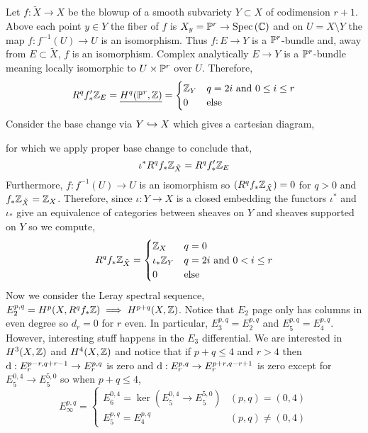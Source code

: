 \documentclass[12pt]{article}
\renewcommand{\C}{\mathbb{C}}
\begin{document}
Let $f : \tilde{X} \to X$ be the blowup of a smooth subvariety $Y \subset X$ of codimension $r + 1$. Above each point $y \in Y$ the fiber of $f$ is $X_y = \P^r \to \Spec{\C}$ and on $U = X \setminus Y$ the map $f : f^{-1}(U) \to U$ is an isomorphism. Thus $f : E \to Y$ is a $\P^r$-bundle and, away from $E \subset \tilde{X}$, $f$ is an isomorphism. Complex analytically $E \to Y$ is a $\P^r$-bundle meaning locally isomorphic to $U \times \P^r$ over $U$. Therefore, 
\[ R^q f'_* \Z_E = \underline{H^q(\P^r, \Z)} = 
\begin{cases}
\Z_Y & q = 2i \text{ and } 0 \le i \le r
\\
0 & \text{else}
\end{cases} \]
Consider the base change via $Y \embed X$ which gives a cartesian diagram,
\begin{center}
\end{center}
for which we apply proper base change to conclude that,
\[ \iota^* R^q f_* \Z_{\tilde{X}} = R^q f'_* \Z_E \]
Furthermore, $f : f^{-1}(U) \to U$ is an isomorphism so $(R^q f_* \Z_{\tilde{X}}) = 0$ for $q > 0$ and $f_* \Z_{\tilde{X}} = \Z_X$. Therefore, since $\iota : Y \to X$ is a closed embedding the functors $\iota^*$ and $\iota_*$ give an equivalence of categories between sheaves on $Y$ and sheaves supported on $Y$ so we compute,
\[ R^q f_* \Z_{\tilde{X}} = 
\begin{cases}
\Z_{X} & q = 0
\\
\iota_* \Z_{Y} & q = 2i \text{ and } 0 < i \le r
\\
0 & \text{else}
\end{cases} \]
Now we consider the Leray spectral sequence, $E_2^{p,q} = H^p(X, R^q f_* \Z) \implies H^{p+q}(X, \Z)$. Notice that $E_2$ page only has columns in even degree so $d_r = 0$ for $r$ even. In particular, $E_3^{p,q} = E_2^{p,q}$ and $E_5^{p,q} = E_4^{p,q}$. However, interesting stuff happens in the $E_3$ differential. We are interested in $H^3(X, \Z)$ and $H^4(X, \Z)$ and notice that if $p + q \le 4$ and $r > 4$ then $\d : E^{p - r, q + r - 1}_r \to E^{p, q}_r$ is zero and $\d : E^{p,q}_r \to E^{p + r, q - r + 1}_r$ is zero except for $E^{0, 4}_5 \to E^{5, 0}_5$ so when $p + q \le 4$,
\[ E^{p,q}_{\infty} =
\begin{cases}
E^{0, 4}_6 = \ker{(E^{0, 4}_5 \to E^{5,0}_5)} & (p,q) = (0,4)
\\
E^{p,q}_5 = E^{p,q}_4 & (p,q) \neq (0, 4)
\end{cases} \]
\end{document}

